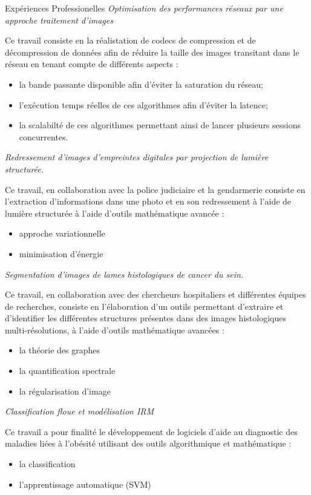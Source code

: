 \begin{rubric}{Expériences Professionelles}
\entry*[2011-]
\textit{Optimisation des performances réseaux par une approche traitement d'images}
\par Ce travail consiste en la réalistation de codecs de compression et de décompression de données
afin de réduire la taille des images transitant dans le réseau en tenant compte de différents aspects :
\begin{itemize}
\item la bande passante disponible afin d'éviter la saturation du réseau;
\item l'exécution temps réelles de ces algorithmes afin d'éviter la latence;  
\item la scalabilté de ces algorithmes permettant ainsi de lancer plusieurs sessions concurrentes.
\end{itemize}

\entry*[2010-2011]
\textit{Redressement d'images d'empreintes digitales par projection de lumière structurée.}
\par Ce travail, en collaboration avec la police judiciaire et la gendarmerie consiste 
en l'extraction d'informations dans une photo et en son redressement à l'aide de lumière structurée à l'aide d'outils mathématique avancée : 
\begin{itemize}
\item approche variationnelle
\item minimisation d'énergie
\end{itemize}
\entry*[2009-2010]
\textit{Segmentation d'images de lames histologiques de cancer du sein.}
\par Ce travail, en collaboration avec des chercheurs hospitaliers et différentes équipes de recherches,
consiste en l'élaboration d'un outils permettant d'extraire et d'identifier les différentes structures 
présentes dans des images histologiques multi-résolutions, à l'aide d'outils mathématique avancées :
\begin{itemize}
\item la théorie des graphes
\item la quantification spectrale
\item la régularisation d'image
\end{itemize} 

\entry*[2004--2008]
\textit{Classification floue et modélisation IRM}
\par Ce travail a pour finalité le développement de logiciels d'aide au diagnostic
des maladies liées à l'obésité utilisant des outils algorithmique et mathématique : 
\begin{itemize}
\item la classification
\item l'apprentissage automatique (SVM)
\end{itemize}    



\end{rubric}
